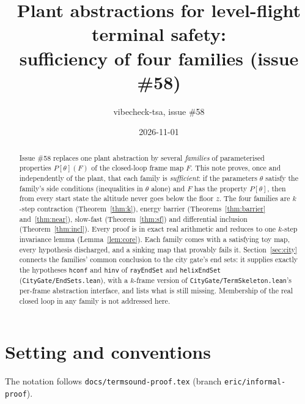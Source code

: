 \documentclass[11pt]{article}
\title{Plant abstractions for level-flight terminal safety:\\ sufficiency of four families (issue \#58)}
\author{vibecheck-tsa, issue \#58}
\date{2026-11-01}
\theoremstyle{definition}
\begin{document}
\sloppy
\maketitle

\begin{abstract}
Issue \#58 replaces one plant abstraction by several \emph{families} of parameterised properties $P[\theta](F)$ of the closed-loop frame map $F$. This note proves, once and independently of the plant, that each family is \emph{sufficient}: if the parameters $\theta$ satisfy the family's side conditions (inequalities in $\theta$ alone) and $F$ has the property $P[\theta]$, then from every start state the altitude never goes below the floor $z$. The four families are $k$-step contraction (Theorem~\ref{thm:k}), energy barrier (Theorems~\ref{thm:barrier} and~\ref{thm:near}), slow-fast (Theorem~\ref{thm:sf}) and differential inclusion (Theorem~\ref{thm:incl}). Every proof is in exact real arithmetic and reduces to one $k$-step invariance lemma (Lemma~\ref{lem:core}). Each family comes with a satisfying toy map, every hypothesis discharged, and a sinking map that provably fails it. Section~\ref{sec:city} connects the families' common conclusion to the city gate's end sets: it supplies exactly the hypotheses \texttt{hconf} and \texttt{hinv} of \texttt{rayEndSet} and \texttt{helixEndSet} (\texttt{CityGate/EndSets.lean}), with a $k$-frame version of \texttt{CityGate/TermSkeleton.lean}'s per-frame abstraction interface, and lists what is still missing. Membership of the real closed loop in any family is not addressed here.
\end{abstract}

\tableofcontents

\section{Setting and conventions}\label{sec:setting}

The notation follows \texttt{docs/termsound-proof.tex} (branch \texttt{eric/informal-proof}).
\end{document}
